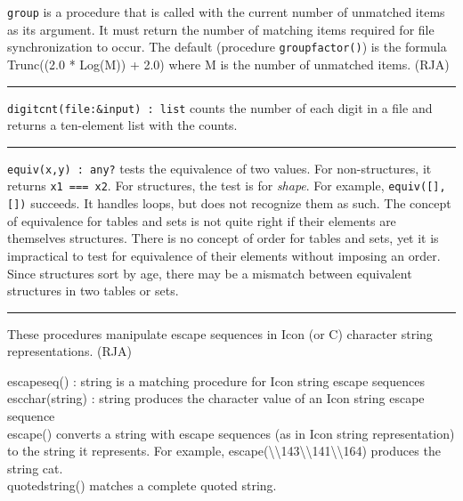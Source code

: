 \texttt{group} is a procedure that is called with the current number of
unmatched items as its argument. It must return the number of matching
items required for file synchronization to occur. The default
(procedure \texttt{groupfactor()}) is the formula Trunc((2.0 * Log(M))
+ 2.0) where M is the number of unmatched items. (RJA)

\vspace{0.25cm}\hrule{}

\texttt{digitcnt(file:\&input) : list} counts the number of each digit
in a file and returns a ten-element list with the counts. 



\vspace{0.25cm}\hrule{}

\texttt{equiv(x,y) : any?} tests the equivalence of two values. For
non-structures, it returns \texttt{x1 === x2}. For structures, the test
is for \textit{shape}. For example,
\texttt{equiv([],[])} succeeds. It handles loops, but does not
recognize them as such. The concept of equivalence for tables and sets
is not quite right if their elements are themselves structures. There
is no concept of order for tables and sets, yet it is impractical to
test for equivalence of their elements without imposing an order. Since
structures sort by {\textquotedbl}age{\textquotedbl}, there may be a
mismatch between equivalent structures in two tables or sets. 

\vspace{0.25cm}\hrule{}

These procedures manipulate escape sequences in
Icon (or C) character string representations. (RJA)

\textsf{escapeseq() : string} is a matching procedure for Icon string
escape sequences\\
\textsf{escchar(string) : string} produces the character value of an
Icon string escape sequence\\
\textsf{escape()} converts a string with escape sequences (as in Icon
string representation) to the string it represents. For example,
\textsf{escape({\textquotedbl}{\textbackslash}{\textbackslash}143{\textbackslash}{\textbackslash}141{\textbackslash}{\textbackslash}164{\textquotedbl})}
produces the string \textsf{{\textquotedbl}cat{\textquotedbl}}.\\
\textsf{quotedstring()} matches a complete quoted string.

